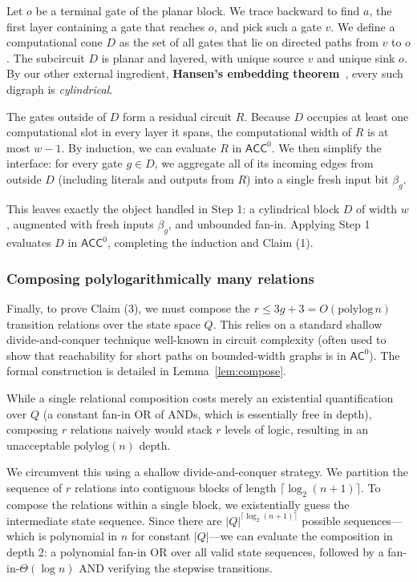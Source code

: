\documentclass[11pt]{article}
\theoremstyle{definition}
\theoremstyle{remark}
\newcommand{\ACC}{\mathsf{ACC}^0}
\newcommand{\AC}{\mathsf{AC}^0}
\begin{document}
Let $o$ be a terminal gate of the planar block. We trace backward to find $a$, the first layer containing a gate that reaches $o$, and pick such a gate $v$. We define a computational cone $D$ as the set of all gates that lie on directed paths from $v$ to $o$.
The subcircuit $D$ is planar and layered, with unique source $v$ and unique sink $o$. By our other external ingredient, \textbf{Hansen's embedding theorem}~\cite[Theorem~2]{Hansen03}, every such digraph is \emph{cylindrical}.

The gates outside of $D$ form a residual circuit $R$. Because $D$ occupies at least one computational slot in every layer it spans, the computational width of $R$ is at most $w-1$. By induction, we can evaluate $R$ in $\ACC$.
We then simplify the interface: for every gate $g \in D$, we aggregate all of its incoming edges from outside $D$ (including literals and outputs from $R$) into a single fresh input bit $\beta_g$.

This leaves exactly the object handled in Step 1: a cylindrical block $D$ of width $w$, augmented with fresh inputs $\beta_g$, and unbounded fan-in. Applying Step 1 evaluates $D$ in $\ACC$, completing the induction and Claim (1).

\subsubsection{Composing polylogarithmically many relations}\label{sec:ov-compose}

Finally, to prove Claim (3), we must compose the $r \le 3g+3 = O(\mathrm{polylog}\, n)$ transition relations over the state space $Q$. This relies on a standard shallow divide-and-conquer technique well-known in circuit complexity (often used to show that reachability for short paths on bounded-width graphs is in $\AC$). The formal construction is detailed in Lemma~\ref{lem:compose}.

While a single relational composition costs merely an existential quantification over $Q$ (a constant fan-in $\mathrm{OR}$ of $\mathrm{AND}$s, which is essentially free in depth), composing $r$ relations naively would stack $r$ levels of logic, resulting in an unacceptable $\mathrm{polylog}(n)$ depth.

We circumvent this using a shallow divide-and-conquer strategy. We partition the sequence of $r$ relations into contiguous blocks of length $\lceil\log_2(n+1)\rceil$. To compose the relations within a single block, we existentially guess the intermediate state sequence. Since there are $|Q|^{\lceil\log_2(n+1)\rceil}$ possible sequences---which is polynomial in $n$ for constant $|Q|$---we can evaluate the composition in depth 2: a polynomial fan-in $\mathrm{OR}$ over all valid state sequences, followed by a fan-in-$\Theta(\log n)$ $\mathrm{AND}$ verifying the stepwise transitions.
\end{document}
